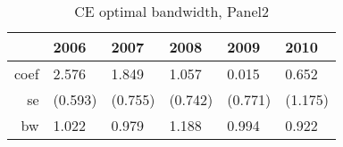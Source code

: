 \begin{table}[ht]
\centering
\begin{tabular}{rlllll}
  \hline
 & 2006 & 2007 & 2008 & 2009 & 2010 \\ 
  \hline
coef & 2.576 & 1.849 & 1.057 & 0.015 & 0.652 \\ 
  se & (0.593) & (0.755) & (0.742) & (0.771) & (1.175) \\ 
  bw & 1.022 & 0.979 & 1.188 & 0.994 & 0.922 \\ 
   \hline
\end{tabular}
\caption{CE optimal bandwidth, Panel2}
\label{tab:rdrobust_panel2}
\end{table}

